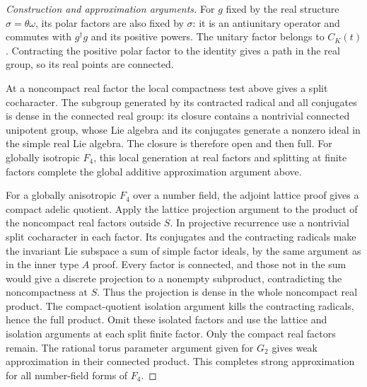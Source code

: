 \documentclass[11pt,a4paper,openany,oneside]{book}
\theoremstyle{resultstyle}
\theoremstyle{definition}
\numberwithin{equation}{chapter}
\begin{document}
\begin{proof}[Construction and approximation arguments]
For \(g\) fixed by the real structure
\(\sigma=\theta\omega\), its polar factors
are also fixed by \(\sigma\): it is an
antiunitary operator and commutes with
\(g^\dagger g\) and its positive powers.
The unitary factor belongs to \(C_K(t)\).
Contracting the positive polar factor
to the identity gives a path in the
real group, so its real points are
connected.

At a noncompact real factor the local
compactness test above gives a split
cocharacter. The subgroup generated
by its contracted radical and all
conjugates is dense in the connected
real group: its closure contains a
nontrivial connected unipotent group,
whose Lie algebra and its conjugates
generate a nonzero ideal in the
simple real Lie algebra. The closure
is therefore open and then full.
For globally isotropic \(F_4\), this
local generation at real factors and
splitting at finite factors complete
the global additive approximation
argument above.

For a globally anisotropic \(F_4\)
over a number field, the adjoint
lattice proof gives a compact adelic
quotient. Apply the lattice projection
argument to the product of the
noncompact real factors outside \(S\).
In projective recurrence use a
nontrivial split cocharacter in
each factor. Its conjugates and the
contracting radicals make the
invariant Lie subspace a sum of
simple factor ideals, by the same
argument as in the inner type \(A\)
proof. Every factor is connected,
and those not in the sum would
give a discrete projection to a
nonempty subproduct, contradicting
the noncompactness at \(S\).
Thus the projection is dense in
the whole noncompact real product.
The compact-quotient isolation
argument kills the contracting
radicals, hence the full product.
Omit these isolated factors and
use the lattice and isolation
arguments at each split finite
factor. Only the compact real
factors remain. The rational torus
parameter argument given for \(G_2\)
gives weak approximation in their
connected product. This completes
strong approximation for all
number-field forms of \(F_4\).


\end{proof}
\end{document}
